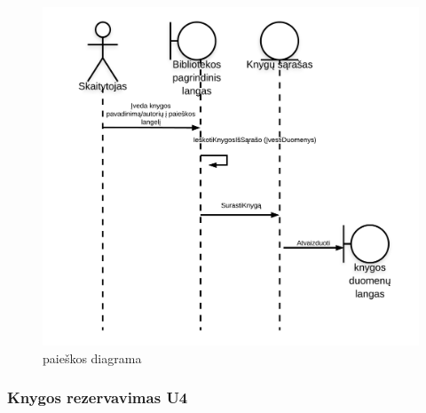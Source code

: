 \documentclass{VUMIFPSkursinis}
\begin{document}
\begin{figure}[H]
\label{fig:searchdiag}
    \centering
    \includegraphics[width=1\textwidth]{Sekos_diagramos/SD_Paieska}
	\caption{paieškos diagrama}
\end{figure}

\subsubsection{Knygos rezervavimas U4}

\end{document}
